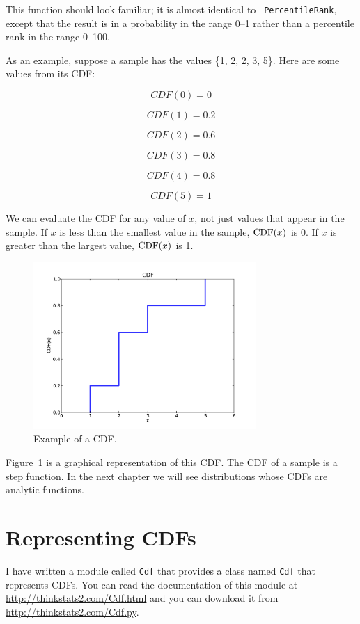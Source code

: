 \documentclass[12pt]{book}
\begin{document}
This function should look familiar; it is almost identical to {\tt
  PercentileRank}, except that the result is in a probability in the
range 0--1 rather than a percentile rank in the range 0--100.

As an example, suppose a sample has the values \{1, 2, 2, 3, 5\}.
Here are some values from its CDF:

\[ CDF(0) = 0 \]

\[ CDF(1) = 0.2\]

\[ CDF(2) = 0.6\]

\[ CDF(3) = 0.8\]

\[ CDF(4) = 0.8\]

\[ CDF(5) = 1\]

We can evaluate the CDF for any value of $x$, not just
values that appear in the sample.
If $x$ is less than the smallest value in the sample, $\mathrm{CDF}(x)$ is 0.
If $x$ is greater than the largest value, $\mathrm{CDF}(x)$ is 1.

\begin{figure}
\centerline{\includegraphics[height=2.5in]{figs/example_cdf.pdf}}
\caption{Example of a CDF.}
\label{example_cdf}
\end{figure}

Figure~\ref{example_cdf} is a graphical representation of this CDF.
The CDF of a sample is a step function.  In the next chapter we
will see distributions whose CDFs are analytic functions.


\section{Representing CDFs}

I have written a module called {\tt Cdf} that provides a class named
{\tt Cdf} that represents CDFs.  You can read the documentation of
this module at \url{http://thinkstats2.com/Cdf.html} and you can download it
from \url{http://thinkstats2.com/Cdf.py}.
\end{document}
